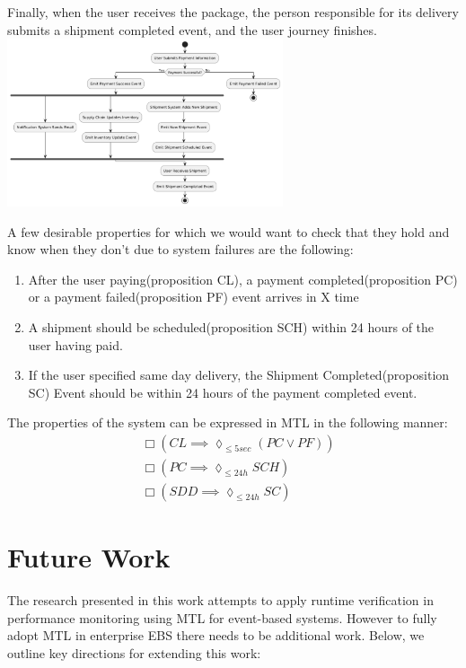 \documentclass[twocolumn]{article}
\begin{document}
Finally, when the user receives the package, the person responsible for its delivery submits a shipment completed event,
and the user journey finishes.
\includegraphics[width=3.2in]{events-diagram.pdf}

A few desirable properties for which we would want to check that they hold and know when they don't due to
system failures are the following:
\begin{enumerate}
	\item After the user paying(proposition CL), a payment completed(proposition PC) or a payment failed(proposition PF) event arrives in X time
	\item A shipment should be scheduled(proposition SCH) within 24 hours of the user having paid.
	\item If the user specified same day delivery, the Shipment Completed(proposition SC) Event should be within 24 hours of the payment completed event.
\end{enumerate}
The properties of the system can be expressed in MTL in the following manner:
\begin{align}
	 & \Box (CL \implies \lozenge_{\leq 5sec}( PC \lor PF)) \\
	 & \Box (PC \implies \lozenge_{\leq 24h} SCH)           \\
	 & \Box (SDD \implies \lozenge_{\leq 24h} SC )
\end{align}


\section{Future Work}
The research presented in this work attempts to apply runtime verification in performance monitoring using MTL for event-based systems. However to fully adopt MTL in enterprise EBS there needs to be additional work. Below, we outline key directions for extending this work:
\end{document}
